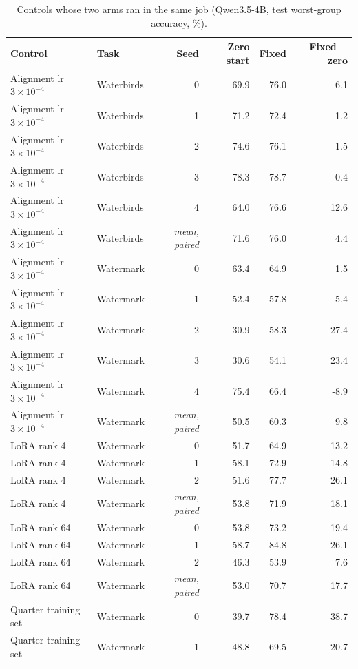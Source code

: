 \documentclass[10pt]{article}
\begin{document}
\begin{longtable}{llrrrr}
\caption{Controls whose two arms ran in the same job (Qwen3.5-4B, test worst-group accuracy, \%).}\label{tab:s-own}\\
\toprule
Control & Task & Seed & Zero start & Fixed & Fixed $-$ zero \\ \midrule
\endhead
Alignment lr $3\times10^{-4}$ & Waterbirds & 0 & 69.9 & 76.0 & 6.1 \\
Alignment lr $3\times10^{-4}$ & Waterbirds & 1 & 71.2 & 72.4 & 1.2 \\
Alignment lr $3\times10^{-4}$ & Waterbirds & 2 & 74.6 & 76.1 & 1.5 \\
Alignment lr $3\times10^{-4}$ & Waterbirds & 3 & 78.3 & 78.7 & 0.4 \\
Alignment lr $3\times10^{-4}$ & Waterbirds & 4 & 64.0 & 76.6 & 12.6 \\
Alignment lr $3\times10^{-4}$ & Waterbirds & \textit{mean, paired} & 71.6 & 76.0 & 4.4 \\
Alignment lr $3\times10^{-4}$ & Watermark & 0 & 63.4 & 64.9 & 1.5 \\
Alignment lr $3\times10^{-4}$ & Watermark & 1 & 52.4 & 57.8 & 5.4 \\
Alignment lr $3\times10^{-4}$ & Watermark & 2 & 30.9 & 58.3 & 27.4 \\
Alignment lr $3\times10^{-4}$ & Watermark & 3 & 30.6 & 54.1 & 23.4 \\
Alignment lr $3\times10^{-4}$ & Watermark & 4 & 75.4 & 66.4 & -8.9 \\
Alignment lr $3\times10^{-4}$ & Watermark & \textit{mean, paired} & 50.5 & 60.3 & 9.8 \\
LoRA rank 4 & Watermark & 0 & 51.7 & 64.9 & 13.2 \\
LoRA rank 4 & Watermark & 1 & 58.1 & 72.9 & 14.8 \\
LoRA rank 4 & Watermark & 2 & 51.6 & 77.7 & 26.1 \\
LoRA rank 4 & Watermark & \textit{mean, paired} & 53.8 & 71.9 & 18.1 \\
LoRA rank 64 & Watermark & 0 & 53.8 & 73.2 & 19.4 \\
LoRA rank 64 & Watermark & 1 & 58.7 & 84.8 & 26.1 \\
LoRA rank 64 & Watermark & 2 & 46.3 & 53.9 & 7.6 \\
LoRA rank 64 & Watermark & \textit{mean, paired} & 53.0 & 70.7 & 17.7 \\
Quarter training set & Watermark & 0 & 39.7 & 78.4 & 38.7 \\
Quarter training set & Watermark & 1 & 48.8 & 69.5 & 20.7 \\

\end{longtable}
\end{document}
